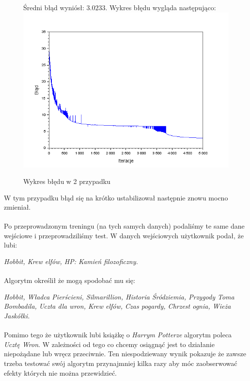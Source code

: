             \begin{figure}[H]
                \centering

                Średni błąd wyniósł: $3.0233$. Wykres błędu wygląda następująco:
                \includegraphics[width=\textwidth]{img/wykres_2.png}

                \caption{Wykres błędu w 2 przypadku}

                \label{rys:2}
            \end{figure}

            W tym przypadku błąd się na krótko ustabilizował następnie znowu mocno zmieniał.


        \paragraph{}
            Po przeprowadzonym treningu (na tych samych danych) podaliśmy te same dane wejściowe
            i przeprowadziliśmy test. W danych wejściowych użytkownik podał, że lubi:

            \textit{
                Hobbit, Krew elfów, HP: Kamień filozoficzny.
            }
        \paragraph{}
            Algorytm określił że mogą spodobać mu się:

            \textit{
                Hobbit,  Władca Pierścieni, Silmarillion,  Historia Śródziemia, Przygody Toma Bombadila,
                Uczta dla wron,  Krew elfów,  Czas pogardy,  Chrzest ognia,  Wieża Jaskółki.
            }

        \paragraph{}
            Pomimo tego że użytkownik lubi książkę o \textit{Harrym Potterze} algorytm poleca \textit{Ucztę Wron}.
            W zależności od tego co chcemy osiągnąć jest to działanie niepożądane lub wręcz przeciwnie.
            Ten niespodziewany wynik pokazuje że zawsze trzeba testować swój algorytm przynajmniej kilka
            razy aby móc zaobserwować efekty których nie można przewidzieć.
